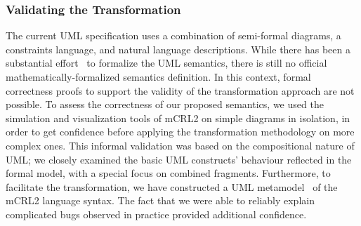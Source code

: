 \documentclass[letter]{llncs}
\newcommand{\secshrink}{\vspace{-.5cm}}
\newcommand{\subsecshrinkbegin}{\vspace{-.2cm}}
\begin{document}
\subsubsection{Validating the Transformation}
\subsecshrinkbegin
\vspace{-9 pt}
The current UML specification uses a combination of semi-formal diagrams, a constraints language, and natural language descriptions.
While there has been a substantial effort~\cite{Broy:2006:USS:1762828.1762881,lazuar2010tool,Diskin06mappings} to formalize the UML semantics, 
there is still no official mathematically-formalized semantics definition. 
In this context, formal correctness proofs to support the validity of the transformation approach are not possible.
To assess the correctness of our proposed semantics, we used the simulation and visualization tools of mCRL2 on
simple diagrams in isolation, in order to get confidence before applying the transformation methodology on
more complex ones. This informal validation was based on the compositional nature of UML; we closely 
examined the basic UML constructs' behaviour reflected in the formal model, with a special focus on combined fragments.
Furthermore, to facilitate the transformation, we have constructed a UML metamodel~\cite{repo:remenska} of the mCRL2 language syntax.
The fact that we were able to reliably explain complicated bugs observed in practice provided additional confidence.
%
% 
\secshrink
\end{document}
